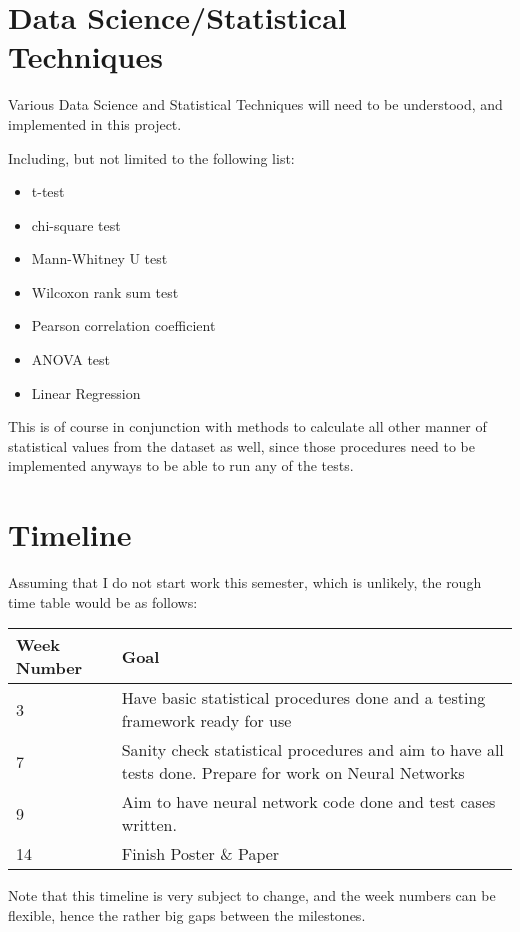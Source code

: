 \documentclass{article}
\begin{document}
\section{Data Science/Statistical Techniques}

Various Data Science and Statistical Techniques will need to be understood,
and implemented in this project.

Including, but not limited to the following list:

\begin{itemize}
\item t-test
\item chi-square test
\item Mann-Whitney U test
\item Wilcoxon rank sum test
\item Pearson correlation coefficient
\item ANOVA test
\item Linear Regression
\end{itemize}

This is of course in conjunction with methods to calculate all other manner
of statistical values from the dataset as well, since those procedures
need to be implemented anyways to be able to run any of the tests.

\section{Timeline}

Assuming that I do not start work this semester, which is unlikely, the rough time table would be as follows:

\begin{center}
\begin{tabular}{p{.2\linewidth}|p{.6\linewidth}}
Week Number & Goal\\
\hline
3 & Have basic statistical procedures done and a testing framework ready for use\\
7 & Sanity check statistical procedures and aim to have all tests done. Prepare for work on Neural Networks\\
9 & Aim to have neural network code done and test cases written.\\
14 & Finish Poster \& Paper\\
\end{tabular}
\end{center}

Note that this timeline is very subject to change, and the week numbers
can be flexible, hence the rather big gaps between the milestones.
\end{document}
